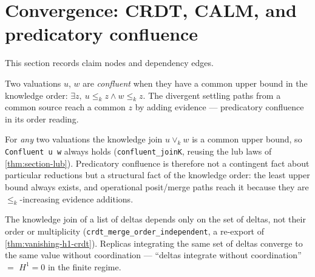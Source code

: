 \section{Convergence: CRDT, CALM, and predicatory confluence}

This section records claim nodes and dependency edges.

\begin{proposition}\label{thm:confluent}\leanok{}
Two valuations $u$, $w$ are \emph{confluent} when they have a common upper bound in the knowledge order: $\exists z,\ u \leq_k z \wedge w \leq_k z$. The divergent settling paths from a common source reach a common $z$ by adding evidence --- predicatory confluence in its order reading.
\end{proposition}
\begin{theorem}\label{thm:confluent-total}\leanok{}
For \emph{any} two valuations the knowledge join $u \vee_k w$ is a common upper bound, so \texttt{Confluent u w} always holds (\texttt{confluent\_joinK}, reusing the lub laws of \cref{thm:section-lub}). Predicatory confluence is therefore not a contingent fact about particular reductions but a structural fact of the knowledge order: the least upper bound always exists, and operational posit/merge paths reach it because they are $\leq_k$-increasing evidence additions.
\end{theorem}
\begin{theorem}\label{thm:crdt-order-independent}\leanok{}
The knowledge join of a list of deltas depends only on the set of deltas, not their order or multiplicity (\texttt{crdt\_merge\_order\_independent}, a re-export of \cref{thm:vanishing-h1-crdt}). Replicas integrating the same set of deltas converge to the same value without coordination --- ``deltas integrate without coordination'' $=$ $H^1 = 0$ in the finite regime.
\end{theorem}
